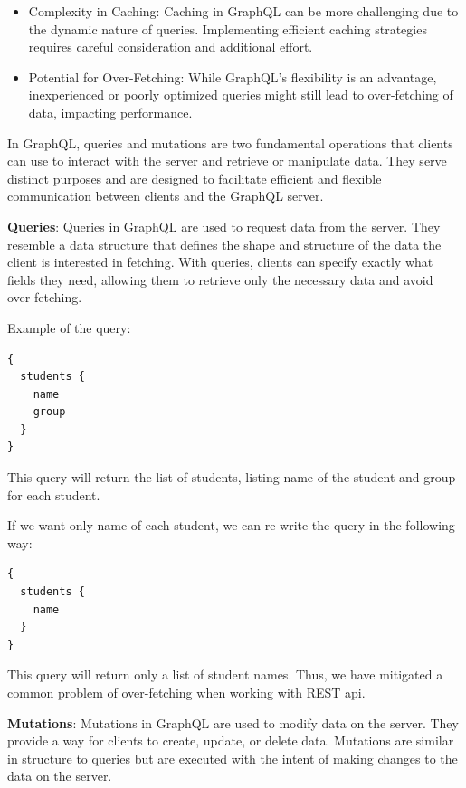 \begin{itemize}
\item Complexity in Caching: Caching in GraphQL can be more challenging due to the dynamic nature of queries. Implementing efficient caching strategies requires careful consideration and additional effort.

\item Potential for Over-Fetching: While GraphQL's flexibility is an advantage, inexperienced or poorly optimized queries might still lead to over-fetching of data, impacting performance.
\end{itemize}

In GraphQL, queries and mutations are two fundamental operations that clients can use to interact with the server and retrieve or manipulate data. They serve distinct purposes and are designed to facilitate efficient and flexible communication between clients and the GraphQL server.


\textbf{Queries}: Queries in GraphQL are used to request data from the server. They resemble a data structure that defines the shape and structure of the data the client is interested in fetching. With queries, clients can specify exactly what fields they need, allowing them to retrieve only the necessary data and avoid over-fetching.

Example of the query:

\begin{lstlisting}
{
  students {
    name
    group
  }
}
\end{lstlisting}

This query will return the list of students, listing name of the student and group for each student.

If we want only name of each student, we can re-write the query in the following way:

\begin{lstlisting}
{
  students {
    name
  }
}
\end{lstlisting}

This query will return only a list of student names. Thus, we have mitigated a common problem of over-fetching when working with REST api.


\textbf{Mutations}: Mutations in GraphQL are used to modify data on the server. They provide a way for clients to create, update, or delete data. Mutations are similar in structure to queries but are executed with the intent of making changes to the data on the server.


\medskip


